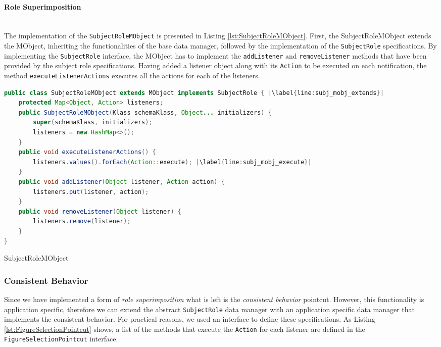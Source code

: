\paragraph{Role Superimposition}\mbox{}\\
The implementation of the \texttt{SubjectRoleMObject} is presented in Listing \ref{lst:SubjectRoleMObject}.
First, the SubjectRoleMObject extends the MObject, inheriting the functionalities of the base data manager, followed by the implementation of the \texttt{SubjectRole} specifications.
By implementing the \texttt{SubjectRole} interface, the MObject has to implement the \texttt{addListener} and \texttt{removeListener} methods that have been provided by the subject role specifications.
Having added a listener object along with its \texttt{Action} to be executed on each notification, the method \texttt{executeListenerActions} executes all the actions for each of the listeners.

\begin{sourcecode} [H]
	\begin{lstlisting}[language=Java, escapechar=|]
public class SubjectRoleMObject extends MObject implements SubjectRole { |\label{line:subj_mobj_extends}|
	protected Map<Object, Action> listeners;
	public SubjectRoleMObject(Klass schemaKlass, Object... initializers) {
		super(schemaKlass, initializers);
		listeners = new HashMap<>();
	}
	public void executeListenerActions() {
		listeners.values().forEach(Action::execute); |\label{line:subj_mobj_execute}|
	}
	public void addListener(Object listener, Action action) {
		listeners.put(listener, action);
	}
	public void removeListener(Object listener) {
		listeners.remove(listener);
	}
}
	\end{lstlisting}
	\caption{SubjectRoleMObject}
	\label{lst:SubjectRoleMObject}
\end{sourcecode}

\subsubsection{Consistent Behavior}
Since we have implemented a form of \textit{role superimposition} what is left is the \textit{consistent behavior} pointcut.
However, this functionality is application specific, therefore we can extend the abstract \texttt{SubjectRole} data manager with an application specific data manager that implements the consistent behavior.
For practical reasons, we used an interface to define these specifications.
As Listing \ref{lst:FigureSelectionPointcut} shows, a list of the methods that execute the \texttt{Action} for each listener are defined in the \texttt{FigureSelectionPointcut} interface. 


